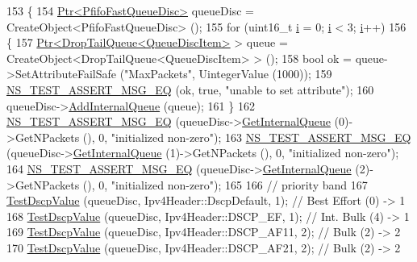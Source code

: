 \begin{DoxyCode}
153 \{
154   \hyperlink{classns3_1_1Ptr}{Ptr<PfifoFastQueueDisc>} queueDisc = CreateObject<PfifoFastQueueDisc> ();
155   \textcolor{keywordflow}{for} (uint16\_t \hyperlink{bernuolliDistribution_8m_a6f6ccfcf58b31cb6412107d9d5281426}{i} = 0; \hyperlink{bernuolliDistribution_8m_a6f6ccfcf58b31cb6412107d9d5281426}{i} < 3; \hyperlink{bernuolliDistribution_8m_a6f6ccfcf58b31cb6412107d9d5281426}{i}++)
156     \{
157       \hyperlink{classns3_1_1Ptr}{Ptr<DropTailQueue<QueueDiscItem>} > queue = 
      CreateObject<DropTailQueue<QueueDiscItem> > ();
158       \textcolor{keywordtype}{bool} ok = queue->SetAttributeFailSafe (\textcolor{stringliteral}{"MaxPackets"}, UintegerValue (1000));
159       \hyperlink{group__testing_ga2a9d78cffb3db8e867c35fff0b698cf5}{NS\_TEST\_ASSERT\_MSG\_EQ} (ok, \textcolor{keyword}{true}, \textcolor{stringliteral}{"unable to set attribute"});
160       queueDisc->\hyperlink{classns3_1_1QueueDisc_a0599223e2a3976ef042a56c2923a2b61}{AddInternalQueue} (queue);
161     \}
162   \hyperlink{group__testing_ga2a9d78cffb3db8e867c35fff0b698cf5}{NS\_TEST\_ASSERT\_MSG\_EQ} (queueDisc->\hyperlink{classns3_1_1QueueDisc_adf09b498c07c5677c26ea4b8309def74}{GetInternalQueue} (0)->GetNPackets 
      (), 0, \textcolor{stringliteral}{"initialized non-zero"});
163   \hyperlink{group__testing_ga2a9d78cffb3db8e867c35fff0b698cf5}{NS\_TEST\_ASSERT\_MSG\_EQ} (queueDisc->\hyperlink{classns3_1_1QueueDisc_adf09b498c07c5677c26ea4b8309def74}{GetInternalQueue} (1)->GetNPackets 
      (), 0, \textcolor{stringliteral}{"initialized non-zero"});
164   \hyperlink{group__testing_ga2a9d78cffb3db8e867c35fff0b698cf5}{NS\_TEST\_ASSERT\_MSG\_EQ} (queueDisc->\hyperlink{classns3_1_1QueueDisc_adf09b498c07c5677c26ea4b8309def74}{GetInternalQueue} (2)->GetNPackets 
      (), 0, \textcolor{stringliteral}{"initialized non-zero"});
165 
166                                                           \textcolor{comment}{// priority         band}
167   \hyperlink{classPfifoFastQueueDiscDscpPrioritization_a153fd90bcf84e06728ad582d63544627}{TestDscpValue} (queueDisc, Ipv4Header::DscpDefault, 1);  \textcolor{comment}{// Best Effort (0) -> 1}
168   \hyperlink{classPfifoFastQueueDiscDscpPrioritization_a153fd90bcf84e06728ad582d63544627}{TestDscpValue} (queueDisc, Ipv4Header::DSCP\_EF, 1);      \textcolor{comment}{// Int. Bulk (4)   -> 1}
169   \hyperlink{classPfifoFastQueueDiscDscpPrioritization_a153fd90bcf84e06728ad582d63544627}{TestDscpValue} (queueDisc, Ipv4Header::DSCP\_AF11, 2);    \textcolor{comment}{// Bulk (2)        -> 2}
170   \hyperlink{classPfifoFastQueueDiscDscpPrioritization_a153fd90bcf84e06728ad582d63544627}{TestDscpValue} (queueDisc, Ipv4Header::DSCP\_AF21, 2);    \textcolor{comment}{// Bulk (2)        -> 2}

\end{DoxyCode}
